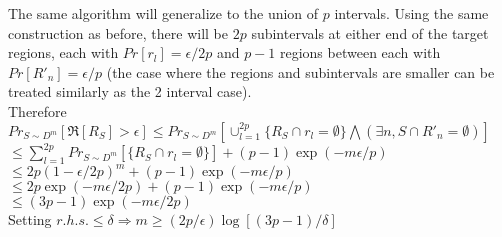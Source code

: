 \documentclass[11pt, oneside]{article}   	%
\begin{document}
The same algorithm will generalize to the union of $p$ intervals. Using the same construction as before, there will be $2p$ subintervals at either end of the target regions, each with $Pr[r_l]=\epsilon/2p$ and $p-1$ regions between each with $Pr[R'_n]=\epsilon/p$ (the case where the regions and subintervals are smaller can be treated similarly as the 2 interval case). \\
\indent Therefore\\
\indent $Pr_{S\sim D^m}[\Re[R_S]>\epsilon]\leq Pr_{S\sim D^m}[\cup_{l=1}^{2p}\{R_S\cap r_l=\emptyset\}\bigwedge(\exists n, S\cap R'_n=\emptyset)]$\\
\indent\indent$\leq\sum_{l=1}^{2p} Pr_{S\sim D^m}[\{R_S \cap r_l = \emptyset\}] + (p-1)\exp(-m\epsilon/p)$\\
\indent\indent$\leq2p(1-\epsilon/2p)^m+(p-1)\exp(-m\epsilon/p)$\\
\indent\indent$\leq2p\exp(-m\epsilon/2p)+(p-1)\exp(-m\epsilon/p)$\\
\indent\indent$\leq(3p-1)\exp(-m\epsilon/2p)$\\
\indent Setting $r.h.s.\leq\delta\Rightarrow m\geq (2p/\epsilon)\log[(3p-1)/\delta]$\\



\end{document}
